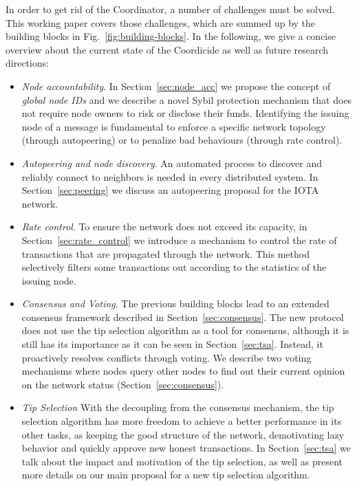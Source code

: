 \documentclass[../main.tex]{subfiles}
\begin{document}
In order to get rid of the Coordinator, a number of challenges must be solved. This working paper covers those challenges, which are summed up by the building blocks in Fig.~\ref{fig:building-blocks}. In the following, we give a concise overview about the current state of the Coordicide as well as future research directions:
\begin{itemize}
    \item \textit{Node accountability}. In Section~\ref{sec:node_acc} we propose the concept of \emph{global node IDs} and we describe a novel Sybil protection mechanism that does not require node owners to risk or disclose their funds. Identifying the issuing node of a message is fundamental to enforce a specific network topology (through autopeering) or to penalize bad behaviours (through rate control).
    
    \item \textit{Autopeering and node discovery}. 
    An automated process to discover and reliably connect to neighbors is needed in every distributed system. In Section~\ref{sec:peering} we discuss an autopeering proposal for the IOTA network.

    \item \textit{Rate control}.
    To ensure the network does not exceed its capacity, in Section~\ref{sec:rate_control} we introduce a mechanism to control the rate of transactions that are propagated through the network. This method selectively filters some transactions out according to the statistics of the issuing node.

    
    \item \textit{Consensus and Voting}.
    The previous building blocks lead to an extended consensus framework described in Section~\ref{sec:consensus}. The new protocol does not use the tip selection algorithm as a tool for consensus, although it is still has its importance as it can be seen in Section~\ref{sec:tsa}. Instead, it proactively resolves conflicts through voting. We describe two voting mechanisms where nodes query other nodes to find out their current opinion on the network status (Section~\ref{sec:consensus}).
    
        \item \textit{Tip Selection}
    With the decoupling from the consensus mechanism, the tip selection algorithm has more freedom to achieve a better performance in its other tasks, as keeping the good structure of the network, demotivating lazy behavior and quickly approve new honest transactions. In Section~\ref{sec:tsa} we talk about the impact and motivation of the tip selection, as well as present more details on our main proposal for a new tip selection algorithm.
    
\end{itemize}
\end{document}
